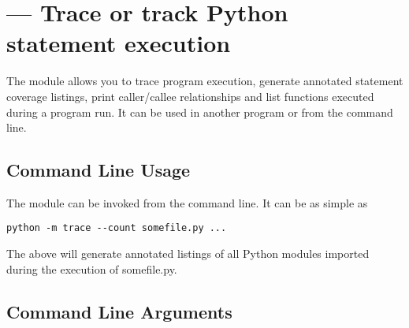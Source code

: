 \section{ ---
         Trace or track Python statement execution}


The  module allows you to trace program execution, generate
annotated statement coverage listings, print caller/callee relationships and
list functions executed during a program run.  It can be used in another
program or from the command line.

\subsection{Command Line Usage}

The  module can be invoked from the command line.  It can be
as simple as

\begin{verbatim}
python -m trace --count somefile.py ...
\end{verbatim}

The above will generate annotated listings of all Python modules imported
during the execution of somefile.py.

\subsection{Command Line Arguments}

